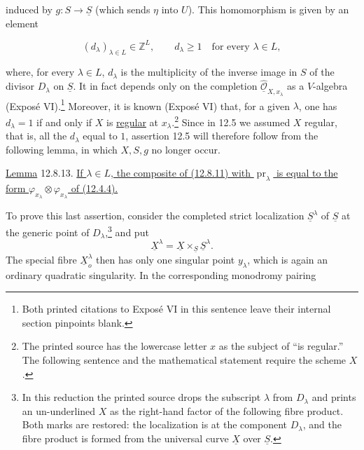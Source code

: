 \begin{center}
\end{center}

\noindent
induced by $g:S\longrightarrow\underline S$ (which sends $\eta$ into
$U$). This homomorphism is given by an element

\begin{equation}\tag{12.8.12}
 (d_\lambda)_{\lambda\in L}\in\mathbb Z^L,\qquad
 d_\lambda\geqslant1\quad\text{for every }\lambda\in L,
\end{equation}

\noindent
where, for every $\lambda\in L$, $d_\lambda$ is the multiplicity of the
inverse image in $S$ of the divisor $D_\lambda$ on $\underline S$. It in
fact depends only on the completion
$\widehat{\underline{\mathcal O}}_{X,x_\lambda}$ as a $V$-algebra
(Expos\'e VI).\footnote{Both printed citations to Expos\'e VI in this
sentence leave their internal section pinpoints blank.} Moreover, it is
known (Expos\'e VI) that, for a given $\lambda$, one has $d_\lambda=1$ if
and only if $X$ is \underline{regular} at $x_\lambda$.\footnote{The
printed source has the lowercase letter $x$ as the subject of ``is
regular.'' The following sentence and the mathematical statement require
the scheme $X$.} Since in 12.5 we assumed $X$ regular, that is, all the
$d_\lambda$ equal to $1$, assertion 12.5 will therefore follow from the
following lemma, in which $X,S,g$ no longer occur.

\medskip
\noindent
\underline{Lemma} 12.8.13. \underline{If $\lambda\in L$, the composite of
(12.8.11) with $\operatorname{pr}_\lambda$ is equal to the form
$\varphi_{x_\lambda}\otimes\varphi_{x_\lambda}$ of (12.4.4).}

\medskip
To prove this last assertion, consider the completed strict localization
$\underline S^\lambda$ of $\underline S$ at the generic point of
$D_\lambda$,\footnote{In this reduction the printed source drops the
subscript $\lambda$ from $D_\lambda$ and prints an un-underlined $X$ as
the right-hand factor of the following fibre product. Both marks are
restored: the localization is at the component $D_\lambda$, and the
fibre product is formed from the universal curve $\underline X$ over
$\underline S$.} and put
\[
 \underline X^\lambda=
 \underline X\times_{\underline S}\underline S^\lambda.
\]
The special fibre $\underline X_o^\lambda$ then has only one singular
point $y_\lambda$, which is again an ordinary quadratic singularity. In
the corresponding monodromy pairing

